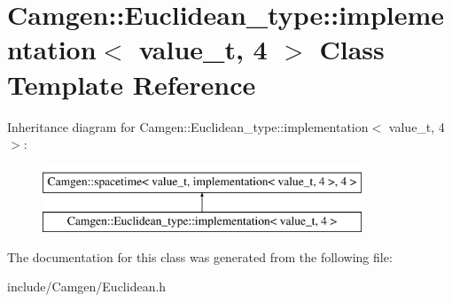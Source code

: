 \hypertarget{a00301}{}\section{Camgen\+:\+:Euclidean\+\_\+type\+:\+:implementation$<$ value\+\_\+t, 4 $>$ Class Template Reference}
\label{a00301}
Inheritance diagram for Camgen\+:\+:Euclidean\+\_\+type\+:\+:implementation$<$ value\+\_\+t, 4 $>$\+:\begin{figure}[H]
\begin{center}
\leavevmode
\includegraphics[height=2.000000cm]{a00301}
\end{center}
\end{figure}


The documentation for this class was generated from the following file\+:\begin{DoxyCompactItemize}
\item 
include/\+Camgen/Euclidean.\+h\end{DoxyCompactItemize}

